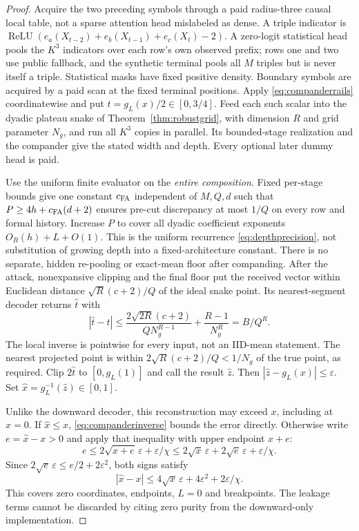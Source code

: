 \documentclass[11pt,letterpaper]{article}
\theoremstyle{definition}\newtheorem{definition}[theorem]{Definition}
\theoremstyle{remark}\newtheorem{remark}[theorem]{Remark}
\begin{document}
\begin{proof}
Acquire the two preceding symbols through a paid radius-three causal local table, not a sparse attention head mislabeled as dense. A triple indicator is
$\operatorname{ReLU}(e_a(X_{t-2})+e_b(X_{t-1})+e_c(X_t)-2)$.
A zero-logit statistical head pools the $K^3$ indicators over each row's own observed prefix; rows one and two use public fallback, and the synthetic terminal pools all $M$ triples but is never itself a triple. Statistical masks have fixed positive density. Boundary symbols are acquired by a paid scan at the fixed terminal positions. Apply \eqref{eq:companderrails} coordinatewise and put $t=g_L(x)/2\in[0,3/4]$. Feed each such scalar into the dyadic plateau snake of Theorem~\ref{thm:robustgrid}, with dimension $R$ and grid parameter $N_g$, and run all $K^3$ copies in parallel. Its bounded-stage realization and the compander give the stated width and depth. Every optional later dummy head is paid.

Use the uniform finite evaluator on the \emph{entire composition}. Fixed per-stage bounds give one constant $c_{\rm FA}$ independent of $M,Q,d$ such that
$P\ge4h+c_{\rm FA}(d+2)$ ensures pre-cut discrepancy at most $1/Q$ on every row and formal history. Increase $P$ to cover all dyadic coefficient exponents $O_R(h)+L+O(1)$. This is the uniform recurrence \eqref{eq:depthprecision}, not substitution of growing depth into a fixed-architecture constant. There is no separate, hidden re-pooling or exact-mean floor after companding.
After the attack, nonexpansive clipping and the final floor put the received vector within Euclidean distance $\sqrt R(c+2)/Q$ of the ideal snake point. Its nearest-segment decoder returns $\widehat t$ with
\[
 |\widehat t-t|\le
 \frac{2\sqrt{2R}(c+2)}{QN_g^{R-1}}+\frac{R-1}{N_g^R}
 =B/Q^R.
\]
The local inverse is pointwise for every input, not an IID-mean statement. The nearest projected point is within $2\sqrt R(c+2)/Q<1/N_g$ of the true point, as required. Clip $2\widehat t$ to $[0,g_L(1)]$ and call the result $\widehat z$. Then
$|\widehat z-g_L(x)|\le\varepsilon$. Set $\widehat x=g_L^{-1}(\widehat z)\in[0,1]$.

Unlike the downward decoder, this reconstruction may exceed $x$, including at $x=0$. If $\widehat x\le x$, \eqref{eq:companderinverse} bounds the error directly. Otherwise write $e=\widehat x-x>0$ and apply that inequality with upper endpoint $x+e$:
\[
 e\le2\sqrt{x+e}\,\varepsilon+\varepsilon/\chi
 \le2\sqrt x\,\varepsilon+2\sqrt e\,\varepsilon+\varepsilon/\chi.
\]
Since $2\sqrt e\,\varepsilon\le e/2+2\varepsilon^2$, both signs satisfy
\begin{equation}\label{eq:symmetricinverse}
 |\widehat x-x|\le4\sqrt x\,\varepsilon+4\varepsilon^2+2\varepsilon/\chi.
\end{equation}
This covers zero coordinates, endpoints, $L=0$ and breakpoints. The leakage terms cannot be discarded by citing zero purity from the downward-only implementation.


\end{proof}
\end{document}
